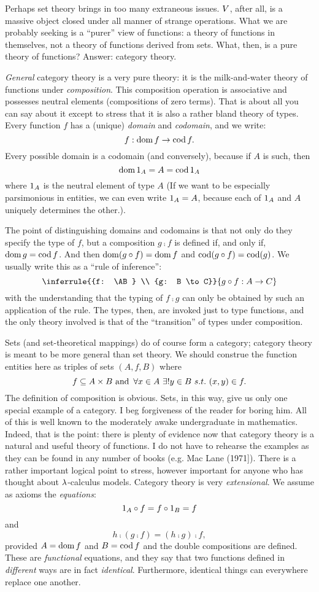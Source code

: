 Perhaps set theory brings in too many extraneous issues. $V$, after all, is a massive
object closed under all manner of strange operations. What we are probably seeking is a
``purer'' view of functions: a theory of functions in themselves, not a theory of
functions derived from sets. What, then, is a pure theory of functions? Answer: category
theory.

{\it General} category theory is a very pure theory: it is the milk-and-water theory of
functions under {\it composition}. This composition operation is associative and possesses
neutral elements (compositions of zero terms). That is about all you can say about it
except to stress that it is also a rather bland theory of types. Every function $f$ has a
(unique) {\it domain} and {\it codomain}, and we write:
$$f: \mathop{\rm dom} f \rightarrow \mathop{\rm cod} f.$$
%
Every possible domain is a codomain (and conversely), because if $A$ is such, then
$$\mathop{\rm dom} {\mathrm 1}_A = A = \mathop{\rm cod} {\mathrm 1}_A$$
%
where ${\mathrm 1}_A$ is the neutral element of type $A$ (If we want to be especially parsimonious
in entities, we can even write ${\mathrm 1}_A = A$, because each of ${\mathrm 1}_A$ and $A$ uniquely
determines the other.).

The point of distinguishing domains and codomains is that not only do they specify the
type of $f$, but a composition $g \comp f$ is defined if, and only if, $\mathop{\rm dom} g = \mathop{\rm cod} f$.
And then $\mathop{\rm dom}(g \circ f) = \mathop{\rm dom} f$ and $\mathop{\rm cod} (g \circ f) = \mathop{\rm cod} (g)$. We usually write
this as a ``rule of inference'':
$$
\inferrule
  {{f: \AB} \\ {g: B \to C}}
  {g \comp f: A \to C}
$$
with the understanding that the typing of $f \comp  g$ can only be obtained by such an
application of the rule. The types, then, are invoked just to type functions, and the only
theory involved is that of the ``transition'' of types under composition.

Sets (and set-theoretical mappings) do of course form a category; category theory is meant
to be more general than set theory. We should construe the function entities here as
triples of sets $(A,f,B)$ where
$$
f \subseteq A \times B {\textrm{ and }}\, \forall x \in A \,\, \exists! y \in B\,\, s.t. \,\, (x,y) \in f.
$$
%
The definition of composition is obvious. Sets, in this way, give us only one special
example of a category. I beg forgiveness of the reader for boring him. All of this is well
known to the moderately awake undergraduate in mathematics. Indeed, that is the point:
there is plenty of evidence now that category theory is a natural and useful theory of
functions. I do not have to rehearse the examples as they can be found in any number of
books (e.g. Mac Lane (1971]). There is a rather important logical point to stress, however
important for anyone who has thought about $\lambda$-calculus models. Category theory is very
{\it extensional}. We assume as axioms the {\it equations}:
%
$${\mathrm 1}_A \circ f = f \circ {\mathrm 1}_B =  f$$
%
and
$$h\comp (g \comp f) = (h \comp g) \comp f,$$
%
provided $A= \mathop{\rm dom} f$ and $B = \mathop{\rm cod} f$ and the double compositions are defined. These are
{\it functional} equations, and they say that two functions defined in {\it different}
ways are in fact {\it identical}. Furthermore, identical things can everywhere replace one
another.


